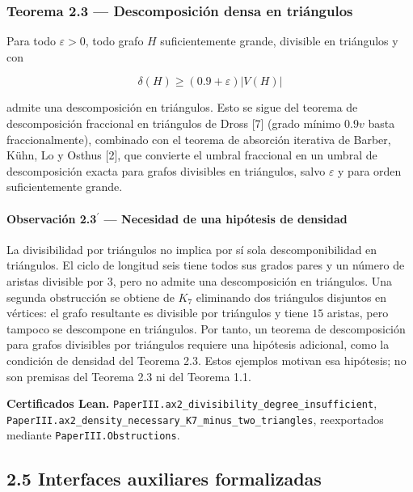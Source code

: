 \documentclass[
  spanish,
  11pt,
  a4paper,
]{article}
\begin{document}
\subsubsection{Teorema 2.3 --- Descomposición densa en triángulos}\label{teorema-2.3-descomposiciuxf3n-densa-en-triuxe1ngulos}

Para todo \(\varepsilon>0\), todo grafo \(H\) suficientemente grande, divisible en triángulos y con

\[
\delta(H)\ge(0.9+\varepsilon)|V(H)|
\]

admite una descomposición en triángulos. Esto se sigue del teorema de descomposición fraccional en triángulos de Dross {[}7{]} (grado mínimo \(0.9v\) basta fraccionalmente), combinado con el teorema de absorción iterativa de Barber, Kühn, Lo y Osthus {[}2{]}, que convierte el umbral fraccional en un umbral de descomposición exacta para grafos divisibles en triángulos, salvo \(\varepsilon\) y para orden suficientemente grande.

\paragraph{\texorpdfstring{Observación 2.3\(^{\prime}\) --- Necesidad de una hipótesis de densidad}{Observación 2.3\^{}\{\textbackslash prime\} --- Necesidad de una hipótesis de densidad}}\label{observaciuxf3n-2.3prime-necesidad-de-una-hipuxf3tesis-de-densidad}

La divisibilidad por triángulos no implica por sí sola descomponibilidad en triángulos. El ciclo de longitud seis tiene todos sus grados pares y un número de aristas divisible por \(3\), pero no admite una descomposición en triángulos. Una segunda obstrucción se obtiene de \(K_7\) eliminando dos triángulos disjuntos en vértices: el grafo resultante es divisible por triángulos y tiene \(15\) aristas, pero tampoco se descompone en triángulos. Por tanto, un teorema de descomposición para grafos divisibles por triángulos requiere una hipótesis adicional, como la condición de densidad del Teorema 2.3. Estos ejemplos motivan esa hipótesis; no son premisas del Teorema 2.3 ni del Teorema 1.1.

\textbf{Certificados Lean.} \texttt{PaperIII.ax2\_divisibility\_degree\_insufficient}, \texttt{PaperIII.ax2\_density\_necessary\_K7\_minus\_two\_triangles}, reexportados mediante \texttt{PaperIII.Obstructions}.

\subsection{2.5 Interfaces auxiliares formalizadas}\label{interfaces-auxiliares-formalizadas}
\end{document}
